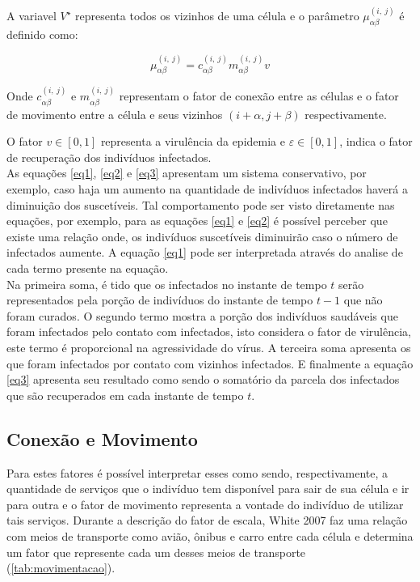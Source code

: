 \documentclass[a4paper,12pt]{article}
\begin{document}
A variavel $V^\star$ representa todos os vizinhos de uma célula e o parâmetro $\mu_{\alpha \beta}^{\left(i,\:j\right)}$ é definido como:

\begin{equation}
   \mu_{\alpha \beta}^{\left(i,\:j\right)} = c_{\alpha\beta}^{\left(i,\:j\right)} m_{\alpha \beta}^{\left(i,\:j\right)} v
\end{equation}

Onde $c_{\alpha \beta}^{\left(i,\:j\right)}$ e $ m_{\alpha \beta}^{\left(i,\:j\right)}$ representam o fator de conexão entre as células e o fator de movimento entre a célula e seus vizinhos $(i + \alpha, j + \beta)$ respectivamente. 

\newpage
O fator $v \in [0, 1]$ representa a virulência da epidemia e $\varepsilon \in [0, 1]$, indica o fator de recuperação dos indivíduos infectados.\\

As equações \ref{eq1}, \ref{eq2} e \ref{eq3} apresentam um sistema conservativo, por exemplo, caso haja um aumento na quantidade de indivíduos infectados haverá a diminuição dos suscetíveis. Tal comportamento pode ser visto diretamente nas equações, por exemplo, para as equações \ref{eq1} e \ref{eq2} é possível perceber que existe uma relação onde, os indivíduos suscetíveis diminuirão caso o número de infectados aumente. A equação \ref{eq1} pode ser interpretada através do analise de cada termo presente na equação.\\

Na primeira soma, é tido que os infectados no instante de tempo $t$ serão representados pela porção de indivíduos do instante de tempo $t-1$ que não foram curados. O segundo termo mostra a porção dos indivíduos saudáveis que foram infectados pelo contato com infectados, isto considera o fator de virulência, este termo é proporcional na agressividade do vírus. A terceira soma apresenta os que foram infectados por contato com vizinhos infectados. E finalmente a equação \ref{eq3} apresenta seu resultado como sendo o somatório da parcela dos infectados que são recuperados em cada instante de tempo $t$.

\subsection{Conexão e Movimento}
Para estes fatores é possível interpretar esses como sendo, respectivamente, a quantidade de serviços que o indivíduo tem disponível para sair de sua célula e ir para outra e o fator de movimento representa a vontade do indivíduo de utilizar tais serviços. Durante a descrição do fator de escala, White 2007\cite{White2007} faz uma relação com meios de transporte como avião, ônibus e carro entre cada célula e determina um fator que represente cada um desses meios de transporte (\ref{tab:movimentacao}).\\
\end{document}
